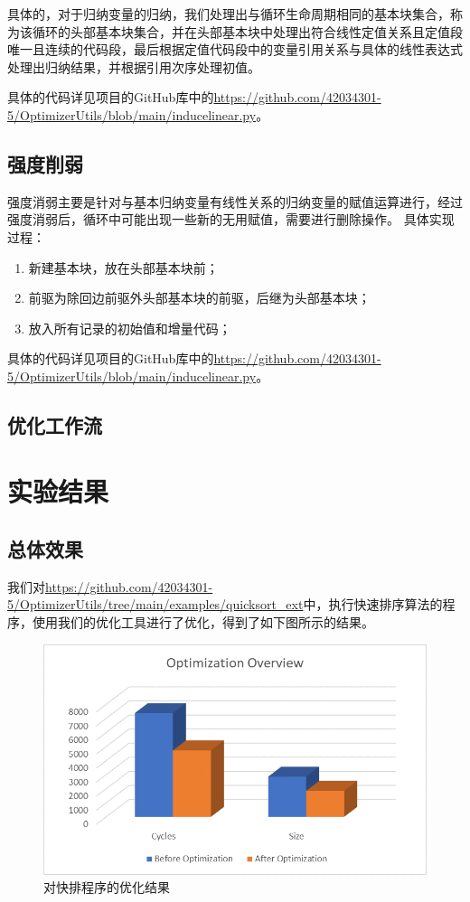 \documentclass[cn,black,11pt,normal]{elegantnote}
\begin{document}
具体的，对于归纳变量的归纳，我们处理出与循环生命周期相同的基本块集合，称为该循环的头部基本块集合，并在头部基本块中处理出符合线性定值关系且定值段唯一且连续的代码段，最后根据定值代码段中的变量引用关系与具体的线性表达式处理出归纳结果，并根据引用次序处理初值。

具体的代码详见项目的GitHub库中的\url{https://github.com/42034301-5/OptimizerUtils/blob/main/inducelinear.py}。

\subsection{强度削弱}

强度消弱主要是针对与基本归纳变量有线性关系的归纳变量的赋值运算进行，经过强度消弱后，循环中可能出现一些新的无用赋值，需要进行删除操作。
具体实现过程：

\begin{enumerate}
    \item 新建基本块，放在头部基本块前；
    \item 前驱为除回边前驱外头部基本块的前驱，后继为头部基本块；
    \item 放入所有记录的初始值和增量代码；
\end{enumerate}

具体的代码详见项目的GitHub库中的\url{https://github.com/42034301-5/OptimizerUtils/blob/main/inducelinear.py}。

\subsection{优化工作流}

\section{实验结果}

\subsection{总体效果}

我们对\url{https://github.com/42034301-5/OptimizerUtils/tree/main/examples/quicksort_ext}中，执行快速排序算法的程序，使用我们的优化工具进行了优化，得到了如下图所示的结果。

\begin{figure}[H]
    \centering
    \includegraphics[width=0.8\linewidth]{image/quicksort_opt.png}
    \caption{对快排程序的优化结果}
\end{figure}
\end{document}
